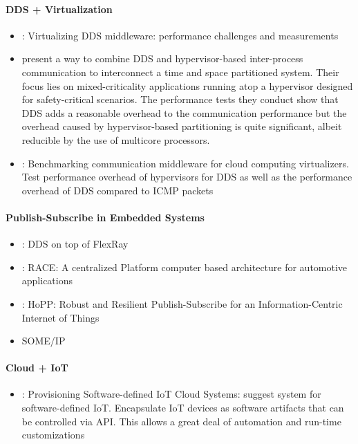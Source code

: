\paragraph{DDS + Virtualization}
\begin{itemize}
	\item \cite{serrano2013virtualizing}: Virtualizing DDS middleware: performance challenges and measurements
	\item \citeauthor*{perez:gutierrez:ieeetpds16} \cite{perez:gutierrez:ieeetpds16} present a way to combine DDS and hypervisor-based inter-process communication to interconnect a time and space partitioned system. Their focus lies on mixed-criticality applications running atop a hypervisor designed for safety-critical scenarios. The performance tests they conduct show that DDS adds a reasonable overhead to the communication performance but the overhead caused by hypervisor-based partitioning is quite significant, albeit reducible by the use of multicore processors.
	\item \cite{garcia2013benchmarking}: Benchmarking communication middleware for cloud computing virtualizers. Test performance overhead of hypervisors for DDS as well as the performance overhead of DDS compared to ICMP packets
\end{itemize}


\paragraph{Publish-Subscribe in Embedded Systems}
\begin{itemize}
	\item \cite{bouhouch2013dds}: DDS on top of FlexRay
	\item \cite{sommer2013race}: RACE: A centralized Platform computer based architecture for automotive applications
	\item \cite{gundougan2018hopp}: HoPP: Robust and Resilient Publish-Subscribe for an Information-Centric Internet of Things
	\item SOME/IP
\end{itemize}


\paragraph{Cloud + IoT}

\begin{itemize}
	\item \cite{nastic2014provisioning}: Provisioning Software-defined IoT Cloud Systems: suggest system for software-defined IoT. Encapsulate IoT devices as software artifacts that can be controlled via API. This allows a great deal of automation and run-time customizations
\end{itemize}


